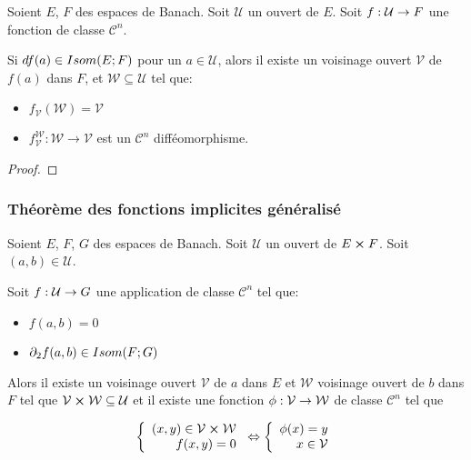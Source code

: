 \begin{theorem}
	Soient $E$, $F$ des espaces de Banach. Soit $\mathcal{U}$ un ouvert de $E$.
	Soit $f : \mathcal{U} \rightarrow F$ une fonction de classe
	$\mathcal{C}^{n}$.

	Si $df(a) \in Isom(E; F)$ pour un $a \in \mathcal{U}$, alors il existe un
	voisinage ouvert $\mathcal{V}$ de $f(a)$ dans $F$, et $\mathcal{W} \subseteq
	\mathcal{U}$ tel que:

	\begin{itemize}
		\item $f_{\mathcal{V}}(\mathcal{W}) = \mathcal{V}$
		\item $f_{\mathcal{V}}^{\mathcal{W}} : \mathcal{W} \rightarrow
			\mathcal{V}$ est un $\mathcal{C}^{n}$ difféomorphisme.
	\end{itemize}
\end{theorem}

\ifdefined\outputproof
\begin{proof}

\end{proof}
\fi

\subsubsection{Théorème des fonctions implicites généralisé}

\begin{theorem}
	Soient $E$, $F$, $G$ des espaces de Banach.
	Soit $\mathcal{U}$ un ouvert de $E \cross F$.
	Soit $(a, b) \in \mathcal{U}$.

	Soit $f : \mathcal{U} \rightarrow G$ une application de classe
	$\mathcal{C}^{n}$ tel que:

	\begin{itemize}
		\item $f(a, b) = 0$
		\item $\partial_{2}f (a, b) \in Isom(F; G)$
	\end{itemize}

	Alors il existe un voisinage ouvert $\mathcal{V}$ de $a$ dans $E$ et
	$\mathcal{W}$ voisinage ouvert de $b$ dans $F$ tel que $\mathcal{V}
	\cross \mathcal{W} \subseteq \mathcal{U}$ et il existe une fonction
	$\phi : \mathcal{V} \rightarrow \mathcal{W}$ de classe $\mathcal{C}^{n}$
	tel que

	\begin{align*}
	\left\{
		\begin{array}{r c l}
			(x, y) \in \mathcal{V} \cross \mathcal{W} \\
			f(x, y) = 0
		\end{array}
	\right.
	\Leftrightarrow
	\left\{
		\begin{array}{r c l}
			\phi(x) = y \\
			x \in \mathcal{V}
		\end{array}
	\right.
	\end{align*}
\end{theorem}

